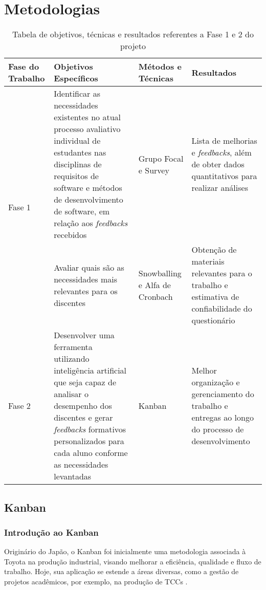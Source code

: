 \chapter[Metodologias]{Metodologias}

\begin{table}[!ht]
    \centering
    \begin{tabularx}{\textwidth}{|X|X|X|X|}
    \hline
    \textbf{Fase do Trabalho} & \textbf{Objetivos Específicos} & \textbf{Métodos e Técnicas} & \textbf{Resultados} \\ \hline
    \multirow{2}{*}{Fase 1} & Identificar as necessidades existentes no atual processo avaliativo individual de estudantes nas disciplinas de requisitos de software e métodos de desenvolvimento de software, em relação aos \textit{feedbacks} recebidos & Grupo Focal e Survey & Lista de melhorias e \textit{feedbacks}, além de obter dados quantitativos para realizar análises \\ \cline{2-4}
    & Avaliar quais são as necessidades mais relevantes para os discentes & Snowballing e Alfa de Cronbach & Obtenção de materiais relevantes para o trabalho e estimativa de confiabilidade do questionário \\ \hline
    Fase 2 & Desenvolver uma ferramenta utilizando inteligência artificial que seja capaz de analisar o desempenho dos discentes e gerar \textit{feedbacks} formativos personalizados para cada aluno conforme as necessidades levantadas & Kanban & Melhor organização e gerenciamento do trabalho e entregas ao longo do processo de desenvolvimento \\ \hline
    \end{tabularx}
    \caption{Tabela de objetivos, técnicas e resultados referentes a Fase 1 e 2 do projeto}
\end{table}

\section{Kanban}
\subsection{Introdução ao Kanban}
Originário do Japão, o Kanban foi inicialmente uma metodologia associada à Toyota na produção industrial, visando melhorar a eficiência, qualidade e fluxo de trabalho. Hoje, sua aplicação se estende a áreas diversas, como a gestão de projetos acadêmicos, por exemplo, na produção de TCCs \cite{corona2013review}.

